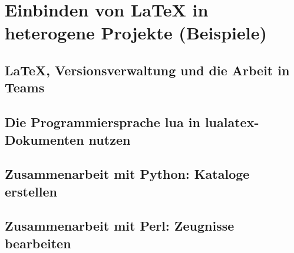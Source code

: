 \chapter{Einbinden von LaTeX in heterogene Projekte (Beispiele)}

\section{LaTeX, Versionsverwaltung und die Arbeit in Teams}

\section{Die Programmiersprache lua in lualatex-Dokumenten nutzen}



\section{Zusammenarbeit mit Python: Kataloge erstellen}

\section{Zusammenarbeit mit Perl: Zeugnisse bearbeiten}
